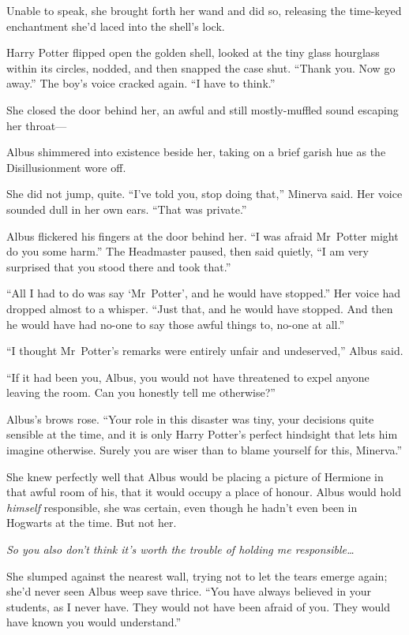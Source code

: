 Unable to speak, she brought forth her wand and did so, releasing the time-keyed enchantment she’d laced into the shell’s lock.

Harry Potter flipped open the golden shell, looked at the tiny glass hourglass within its circles, nodded, and then snapped the case shut.
“Thank you. Now go away.” The boy’s voice cracked again.
“I have to think.”

\later

She closed the door behind her, an awful and still mostly-muffled sound escaping her throat—

Albus shimmered into existence beside her, taking on a brief garish hue as the Disillusionment wore off.

She did not jump, quite.
“I’ve told you, stop doing that,” Minerva said. Her voice sounded dull in her own ears.
“That was private.”

Albus flickered his fingers at the door behind her.
“I was afraid Mr~Potter might do you some harm.” The Headmaster paused, then said quietly,
“I am very surprised that you stood there and took that.”

“All I had to do was say ‘Mr~Potter’, and he would have stopped.” Her voice had dropped almost to a whisper.
“Just that, and he would have stopped. And then he would have had no-one to say those awful things to, no-one at all.”

“I thought Mr~Potter’s remarks were entirely unfair and undeserved,” Albus said.

“If it had been you, Albus, you would not have threatened to expel anyone leaving the room. Can you honestly tell me otherwise?”

Albus’s brows rose.
“Your role in this disaster was tiny, your decisions quite sensible at the time, and it is only Harry Potter’s perfect hindsight that lets him imagine otherwise. Surely you are wiser than to blame yourself for this, Minerva.”

She knew perfectly well that Albus would be placing a picture of Hermione in that awful room of his, that it would occupy a place of honour. Albus would hold \emph{himself} responsible, she was certain, even though he hadn’t even been in Hogwarts at the time. But not her.

\emph{So you also don’t think it’s worth the trouble of holding me responsible…}

She slumped against the nearest wall, trying not to let the tears emerge again; she’d never seen Albus weep save thrice.
“You have always believed in your students, as I never have. They would not have been afraid of you. They would have known you would understand.”

